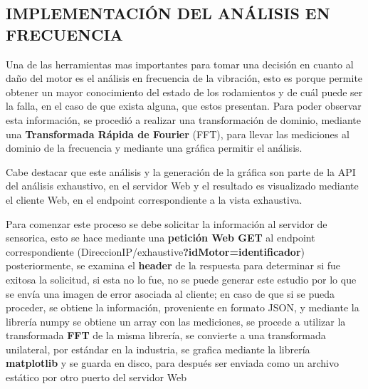 
\subsection{IMPLEMENTACIÓN DEL ANÁLISIS EN FRECUENCIA}

Una de las herramientas mas importantes para tomar una decisión en cuanto
al daño del motor es el análisis en frecuencia de la vibración, esto es porque
permite obtener un mayor conocimiento del estado de los rodamientos y de cuál
puede ser la falla, en el caso de que exista alguna, que estos presentan. Para
poder observar esta información, se procedió a realizar una transformación de
dominio, mediante una \textbf{Transformada Rápida de Fourier} (FFT), para
llevar las mediciones al dominio de la frecuencia
y mediante una gráfica permitir el análisis.

Cabe destacar que este análisis y la generación de la gráfica son parte de la
API del análisis exhaustivo, en el servidor Web y el resultado es visualizado
mediante el cliente Web, en el endpoint correspondiente a la vista exhaustiva.

Para comenzar este proceso se debe  solicitar la información al servidor de
sensorica, esto se hace mediante una \textbf{petición Web GET} al endpoint
correspondiente (DireccionIP/exhaustive\textbf{?idMotor=identificador}) posteriormente,
se examina el \textbf{header} de la respuesta para determinar si fue exitosa
la solicitud, si esta no lo fue, no se puede generar este estudio por lo que se envía una
imagen de error asociada al cliente; en caso de que si se pueda proceder, se
obtiene la información, proveniente en formato JSON, y mediante la librería
numpy se obtiene un array con las mediciones, se procede a utilizar la transformada
\textbf{FFT} de la misma librería, se convierte a una transformada unilateral,
por estándar en la industria,  se grafica mediante la librería \textbf{matplotlib}
y se guarda en disco, para después ser enviada como un archivo estático por otro
puerto del servidor Web
